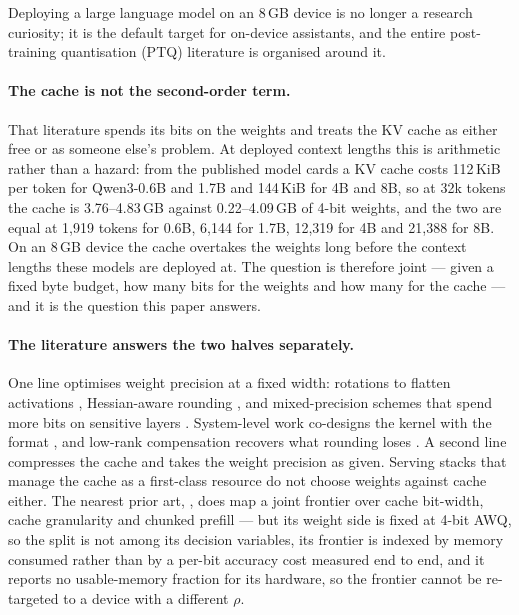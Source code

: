 \documentclass[5p]{elsarticle}
\newcommand{\rhoSym}{\rho}
\begin{document}
Deploying a large language model on an 8\,GB device is no longer a research
curiosity; it is the default target for on-device assistants, and the entire
post-training quantisation (PTQ) literature is organised around it.

\paragraph*{The cache is not the second-order term.}
That literature spends its bits on the weights and treats the KV cache as either
free or as someone else's problem. At deployed context lengths this is
arithmetic rather than a hazard: from the published model cards a KV cache costs
112\,KiB per token for Qwen3-0.6B and 1.7B and 144\,KiB for 4B and 8B, so at 32k
tokens the cache is 3.76--4.83\,GB against 0.22--4.09\,GB of 4-bit weights, and
the two are equal at 1{,}919 tokens for 0.6B, 6{,}144 for 1.7B, 12{,}319 for 4B
and 21{,}388 for 8B. On an 8\,GB device the cache overtakes the weights long
before the context lengths these models are deployed at. The question is
therefore joint --- given a fixed byte budget, how many bits for the weights and
how many for the cache --- and it is the question this paper answers.

\paragraph*{The literature answers the two halves separately.}
One line optimises weight precision at a fixed width: rotations to flatten
activations \cite{quarot,spinquant,duquant,sun2024}, Hessian-aware rounding
\cite{gptq,frantar2022}, and mixed-precision schemes that spend more bits on
sensitive layers \cite{hawqv2,mixllm,gamma,alignquant,wang2018}. System-level
work co-designs the kernel with the format
\cite{lin2024,zhao2023,wei2024,guo2026,mixquant}, and low-rank compensation
recovers what rounding loses \cite{song2026,park2026,liu2025}. A second line
compresses the cache \cite{kivi,kvquant,mixkvq,kvpareto,duanmu2024,su2025,he2024}
and takes the weight precision as given. Serving stacks that manage the cache as
a first-class resource \cite{kwon2023} do not choose weights against cache
either. The nearest prior art, \cite{kvpareto}, does map a joint frontier over
cache bit-width, cache granularity and chunked prefill --- but its weight side is
fixed at 4-bit AWQ, so the split is not among its decision variables, its
frontier is indexed by memory consumed rather than by a per-bit accuracy cost
measured end to end, and it reports no usable-memory fraction for its hardware,
so the frontier cannot be re-targeted to a device with a different $\rhoSym$.
\end{document}
